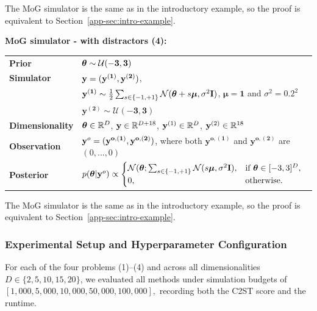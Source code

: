 The MoG simulator is the same as in the introductory example, so the proof is equivalent to Section~\ref{app-sec:intro-example}.

\textbf{MoG simulator - with distractors (4):}

\begin{tabular}{@{}ll@{}}
  \textbf{Prior} & $\boldsymbol{\theta} \sim \mathcal{U}(-\mathbf{3}, \mathbf{3})$ \\ [5pt]
  \textbf{Simulator} & $\mathbf{y}=(\mathbf{y^{(1)}}, \mathbf{y^{(2)}})$,\\[5pt]
  &$\mathbf{y^{(1)}} \sim \frac{1}{2} \sum_{s \in \{-1, +1\}} \mathcal{N}(\boldsymbol{\theta} + s\boldsymbol{\mu}, \sigma^2\mathbf{I})$, $\boldsymbol{\mu} = \mathbf{1}$ and $\sigma^2=0.2^2$ \\[5pt]
  &$\mathbf{y^{(2)}} \sim \mathcal{U}(\mathbf{-3}, \mathbf{3})$ \\ [5pt]
  \textbf{Dimensionality} & $\boldsymbol{\theta} \in \mathbb{R}^{D}$, $\mathbf{y} \in \mathbb{R}^{D + 18}$, $\mathbf{y}^{(1)} \in \mathbb{R}^{D}$, $\mathbf{y}^{(2)} \in \mathbb{R}^{18}$ \\ [5pt]
  \textbf{Observation} & $\mathbf{y}^o = (\mathbf{y^{o, (1)}}, \mathbf{y^{o, (2)}})$, where both $\mathbf{y^{o, (1)}}$ and $\mathbf{y^{o, (2)}}$  are $(0, \ldots, 0) $ \\ [5pt]
  \textbf{Posterior} & $ p(\boldsymbol{\theta} | \mathbf{y}^o) \propto
                       \begin{cases}
                         \mathcal{N}(\boldsymbol{\theta}; \sum_{s \in \{-1, +1\}} \mathcal{N}(s\boldsymbol{\mu}, \sigma^2 \mathbf{I}), & \text{if } \boldsymbol{\theta} \in [-3, 3]^D, \\
                                      0, & \text{otherwise}.
                                    \end{cases} $ \\ [5pt]
\end{tabular}

The MoG simulator is the same as in the introductory example, so the proof is equivalent to Section~\ref{app-sec:intro-example}.

\subsubsection{Experimental Setup and Hyperparameter Configuration}

For each of the four problems (1)--(4) and across all dimensionalities 
$D \in \{2, 5, 10, 15, 20\}$, we evaluated all methods under simulation budgets of
\(
[1{,}000, 5{,}000, 10{,}000, 50{,}000, 100{,}000],
\)
recording both the C2ST score and the runtime.

